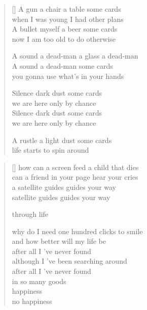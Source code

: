 \documentclass[12pt]{article}
\begin{document}
\newpage

\latintext

\settowidth{\versewidth}{now I am too old to do otherwise}
\begin{verse}[\versewidth]
  A gun a chair a table some cards \\
  when I was young I had other plans \\
  A bullet myself a beer some cards \\
  now I am too old to do otherwise

  A sound a dead-man a glass a dead-man \\
  A sound a dead-man some cards \\
  you gonna use what's in your hands

  Silence dark dust some cards \\
  we are here only by chance \\
  Silence dark dust some cards \\
  we are here only by chance

  A rustle a light dust some cards \\
  life starts to spin around
\end{verse}

\newpage

\settowidth{\versewidth}{a satellite guides guides}
\begin{verse}[\versewidth]
  how can a screen feed a child that dies \\
  can a friend in your page hear your cries \\
  a satellite guides guides your way \\
  satellite guides guides your way

  through life

  why do I need one hundred clicks to smile \\
  and how better will my life be \\
  after all I 've never found \\
  although I 've been searching around \\
  after all I 've never found \\
  in so many goods \\
  happiness  \\
  no happiness
\end{verse}
\end{document}
